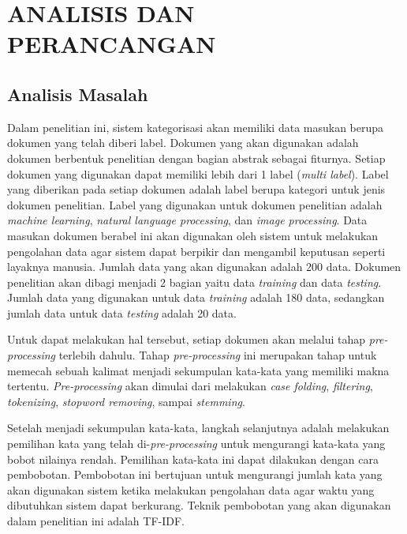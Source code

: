 \chapter{ANALISIS DAN PERANCANGAN}

\vspace{4.5pt}

\section{Analisis Masalah}
\indent
Dalam penelitian ini, sistem kategorisasi akan memiliki data masukan berupa dokumen yang telah diberi label. Dokumen yang akan digunakan adalah dokumen berbentuk penelitian dengan bagian abstrak sebagai fiturnya. Setiap dokumen yang digunakan dapat memiliki lebih dari 1 label ({\itshape multi label}). Label yang diberikan pada setiap dokumen adalah label berupa kategori untuk jenis dokumen penelitian. Label yang digunakan untuk dokumen penelitian adalah {\itshape machine learning}, {\itshape natural language processing}, dan {\itshape image processing}. Data masukan dokumen berabel ini akan digunakan oleh sistem untuk melakukan pengolahan data agar sistem dapat berpikir dan mengambil keputusan seperti layaknya manusia. Jumlah data yang akan digunakan adalah 200 data. Dokumen penelitian akan dibagi menjadi 2 bagian yaitu data {\itshape training} dan data {\itshape testing}. Jumlah data yang digunakan untuk data {\itshape training} adalah 180 data, sedangkan jumlah data untuk data {\itshape testing} adalah 20 data.

\indent
Untuk dapat melakukan hal tersebut, setiap dokumen akan melalui tahap {\itshape pre-processing} terlebih dahulu. Tahap {\itshape pre-processing} ini merupakan tahap untuk memecah sebuah kalimat menjadi sekumpulan kata-kata yang memiliki makna tertentu. {\itshape Pre-processing} akan dimulai dari melakukan {\itshape case folding}, {\itshape filtering}, {\itshape tokenizing}, {\itshape stopword removing}, sampai {\itshape stemming}.

\indent
Setelah menjadi sekumpulan kata-kata, langkah selanjutnya adalah melakukan pemilihan kata yang telah di-{\itshape pre-processing} untuk mengurangi kata-kata yang bobot nilainya rendah. Pemilihan kata-kata ini dapat dilakukan dengan cara pembobotan. Pembobotan ini bertujuan untuk mengurangi jumlah kata yang akan digunakan sistem ketika melakukan pengolahan data agar waktu yang dibutuhkan sistem dapat berkurang. Teknik pembobotan yang akan digunakan dalam penelitian ini adalah TF-IDF.

